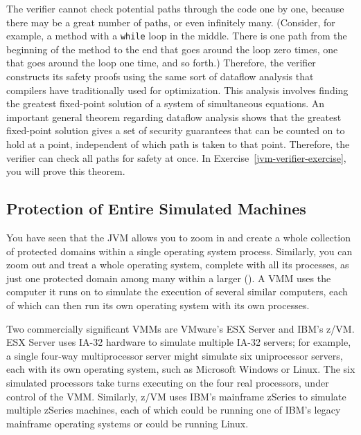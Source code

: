 The verifier cannot check potential paths through the code one
by one, because there may be a great number of paths, or even
infinitely many.  (Consider, for example, a method with a \verb|while|
loop in the middle.  There is one path from the beginning of the
method to the end that goes around the loop zero times, one that goes
around the loop one time, and so forth.)  Therefore, the verifier constructs
its safety proofs using the same sort of dataflow analysis that
compilers have traditionally used for optimization.  This analysis
involves finding the greatest fixed-point solution of a system of
simultaneous equations.  An important general theorem regarding
dataflow analysis shows that the greatest fixed-point solution gives a
set of security guarantees that can be counted on to hold at a point,
independent of which path is taken to that point.  Therefore, the
verifier can check all paths for safety at once.  In
Exercise~\ref{jvm-verifier-exercise}, you will prove this theorem.

\subsection{Protection of Entire Simulated Machines}\label{virtual-machines-subsection}

You have seen that the JVM allows you to zoom in and create a whole collection
of protected domains within a single operating system process.
Similarly, you can zoom out and treat a whole operating system,
complete with all its processes, as just one protected domain among
many within a larger  ().
A VMM uses the computer it runs on to simulate the execution of
several similar computers, each of which can then run its own
operating system with its own processes.

Two commercially significant VMMs are VMware's ESX
Server and IBM's z/VM.  ESX Server uses IA-32 hardware to
simulate multiple IA-32 servers; for example, a single four-way
multiprocessor server might simulate six uniprocessor servers, each
with its own operating system, such as Microsoft Windows or Linux.
The six simulated processors take turns executing on the four real
processors, under control of the VMM.  Similarly, z/VM uses IBM's
mainframe zSeries to simulate multiple zSeries machines, each of which
could be running one of IBM's legacy mainframe operating systems or
could be running Linux.

